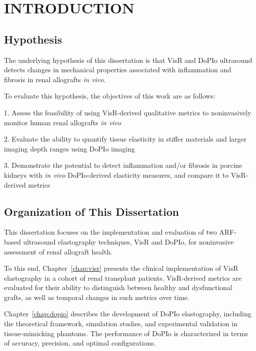 
\chapter{INTRODUCTION}







\section{Hypothesis}

The underlying hypothesis of this dissertation is that VisR and DoPIo ultrasound detects changes in mechanical properties associated with inflammation and fibrosis in renal allografts \emph{in vivo}.

To evaluate this hypothesis, the objectives of this work are as follows:

1. Assess the feasibility of using VisR-derived qualitative metrics to noninvasively monitor human renal allografts \emph{in vivo}

2. Evaluate the ability to quantify tissue elasticity in stiffer materials and larger imaging depth ranges using DoPIo imaging

3. Demonstrate the potential to detect inflammation and/or fibrosis in porcine kidneys with \emph{in vivo} DoPIo-derived elasticity measures, and compare it to VisR-derived metrics

\section{Organization of This Dissertation}

This dissertation focuses on the implementation and evaluation of two ARF-based ultrasound elastography techniques, VisR and DoPIo, for noninvasive assessment of renal allograft health.

To this end, Chapter~\ref{chap:visr} presents the clinical implementation of VisR elastography in a cohort of renal transplant patients. VisR-derived metrics are evaluated for their ability to distinguish between healthy and dysfunctional grafts, as well as temporal changes in such metrics over time.

Chapter~\ref{chap:dopio} describes the development of DoPIo elastography, including the theoretical framework, simulation studies, and experimental validation in tissue-mimicking phantoms. The performance of DoPIo is characterized in terms of accuracy, precision, and optimal configurations.

